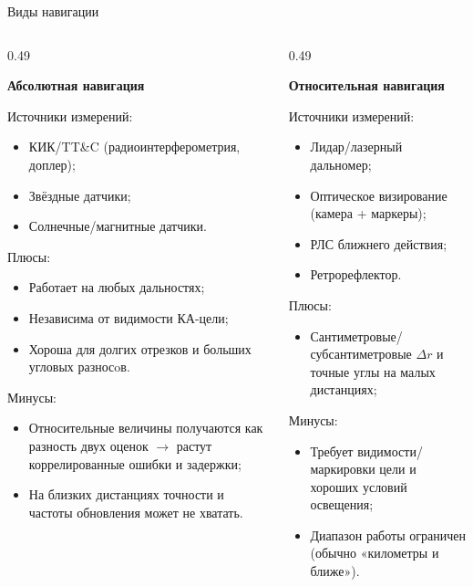 \documentclass[8pt]{beamer}
\begin{document}
\begin{frame}{Виды навигации}
\begin{columns}[T,totalwidth=\textwidth]
  \begin{column}{0.49\textwidth}
    \begin{center}
        \textbf{Абсолютная навигация}
    \end{center}
    Источники измерений:
    \begin{itemize}
        \item КИК/TT\&C (радиоинтерферометрия, доплер); 
        \item Звёздные датчики; 
        \item Солнечные/магнитные датчики.
    \end{itemize}
    Плюсы:
    \begin{itemize}
        \item Работает на любых дальностях;
        \item Независима от видимости КА-цели;
        \item Хороша для долгих отрезков и больших угловых разносoв.
    \end{itemize}
    Минусы:
    \begin{itemize}
        \item Относительные величины получаются как разность двух оценок $\longrightarrow$ растут коррелированные ошибки и задержки;
        \item На близких дистанциях точности и частоты обновления может не хватать.
    \end{itemize}
  \end{column}

  \begin{column}{0.49\textwidth}
    \begin{center}
        \textbf{Относительная навигация}
    \end{center}
    Источники измерений:
    \begin{itemize}
        \item Лидар/лазерный дальномер;
        \item Оптическое визирование (камера + маркеры);
        \item РЛС ближнего действия;
        \item Ретрорефлектор.
    \end{itemize}
    Плюсы:
    \begin{itemize}
        \item Сантиметровые/субсантиметровые $\Delta r$ и точные углы на малых дистанциях;
    \end{itemize}
    Минусы:
    \begin{itemize}
        \item Требует видимости/маркировки цели и хороших условий освещения;
        \item Диапазон работы ограничен (обычно «километры и ближе»).
    \end{itemize}
  \end{column}
\end{columns}
\end{frame}
\end{document}
